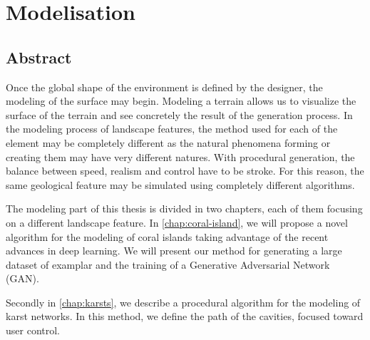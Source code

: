 \part{Modelisation}

\chapter*{Abstract}
\label{chap:modelisation-abstract}

Once the global shape of the environment is defined by the designer, the modeling of the surface may begin. Modeling a terrain allows us to visualize the surface of the terrain and see concretely the result of the generation process. In the modeling process of landscape features, the method used for each of the element may be completely different as the natural phenomena forming or creating them may have very different natures. With procedural generation, the balance between speed, realism and control have to be stroke. For this reason, the same geological feature may be simulated using completely different algorithms.

The modeling part of this thesis is divided in two chapters, each of them focusing on a different landscape feature. In \cref{chap:coral-island}, we will propose a novel algorithm for the modeling of coral islands taking advantage of the recent advances in deep learning. We will present our method for generating a large dataset of examplar and the training of a Generative Adversarial Network (GAN).

Secondly in \cref{chap:karsts}, we describe a procedural algorithm for the modeling of karst networks. In this method, we define the path of the cavities, focused toward user control.



